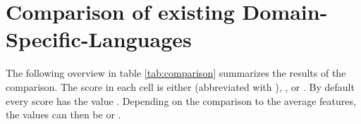 
\section{Comparison of existing Domain-Specific-Languages}



The following overview in table \ref{tab:comparison} summarizes the results of the comparison. The score in each cell is either  (abbreviated with ), , or . By default every score has the value . Depending on the comparison to the average features, the values can then be  or .

